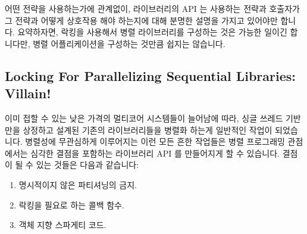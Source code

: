 어떤 전략을 사용하는가에 관계없이, 라이브러리의 API 는 사용하는 전략과 호출자가
그 전략과 어떻게 상호작용 해야 하는지에 대해 분명한 설명을 가지고 있어야만
합니다.
요약하자면, 락킹을 사용해서 병렬 라이브러리를 구성하는 것은 가능한 일이긴
합니다만, 병렬 어플리케이션을 구성하는 것만큼 쉽지는 않습니다.

\subsection{Locking For Parallelizing Sequential Libraries: Villain!}
\label{sec:locking:Locking For Parallelizing Sequential Libraries: Villain!}

이미 접할 수 있는 낮은 가격의 멀티코어 시스템들이 늘어남에 따라, 싱글 쓰레드
기반만을 상정하고 설계된 기존의 라이브러리들을 병렬화 하는게 일반적인 작업이
되었습니다.
병렬성에 무관심하게 이루어지는 이런 모든 흔한 작업들은 병렬 프로그래밍
관점에서는 심각한 결점을 포함하는 라이브러리 API 를 만들어지게 할 수 있습니다.
결점이 될 수 있는 것들은 다음과 같습니다:

\begin{enumerate}
\item	명시적이지 않은 파티셔닝의 금지.
\item	락킹을 필요로 하는 콜백 함수.
\item	객체 지향 스파게티 코드.
\end{enumerate}

